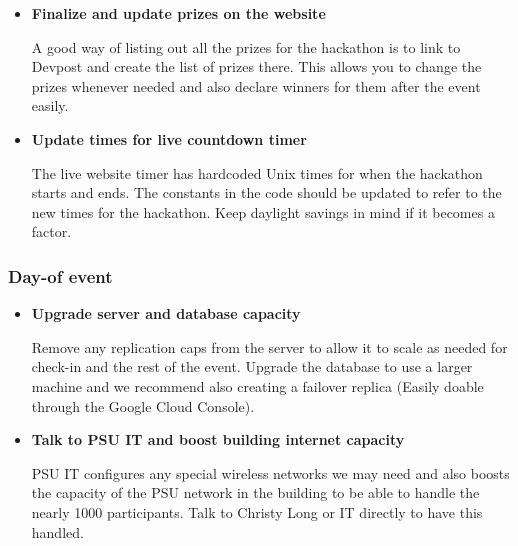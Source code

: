 \documentclass[twoside, 12pt]{article}
\newenvironment{tightitemize} %
{\begin{itemize}\itemsep1pt \parskip0pt \parsep0pt}
{\end{itemize}\vspace{-\topsep}}
\begin{document}
\begin{tightitemize}
    \item \textbf{Finalize and update prizes on the website}
    \par A good way of listing out all the prizes for the hackathon is to link to Devpost and create the list of prizes there. This allows you to change the prizes whenever needed and also declare winners for them after the event easily.
    
    \item \textbf{Update times for live countdown timer}
    \par The live website timer has hardcoded Unix times for when the hackathon starts and ends. The constants in the code should be updated to refer to the new times for the hackathon. Keep daylight savings in mind if it becomes a factor.
\end{tightitemize}
\subsubsection{Day-of event}
\begin{tightitemize}
    \item \textbf{Upgrade server and database capacity}
    \par Remove any replication caps from the server to allow it to scale as needed for check-in and the rest of the event. Upgrade the database to use a larger machine and we recommend also creating a failover replica (Easily doable through the Google Cloud Console).
    
    \item \textbf{Talk to PSU IT and boost building internet capacity}
    \par PSU IT configures any special wireless networks we may need and also boosts the capacity of the PSU network in the building to be able to handle the nearly 1000 participants. Talk to Christy Long or IT directly to have this handled.
\end{tightitemize}
\end{document}
